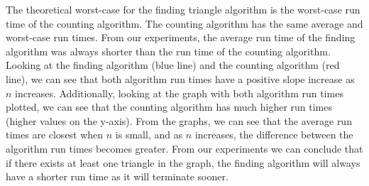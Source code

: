 \documentclass[12pt, letterpaper]{article}
\begin{document}
\begin{enumerate}
    The theoretical worst-case for the finding triangle algorithm is the worst-case run time of the counting algorithm. The counting algorithm has the same average and worst-case run times. From our experiments, the average run time of the finding algorithm was always shorter than the run time of the counting algorithm.  Looking at the finding algorithm (blue line) and the counting algorithm (red line), we can see that both algorithm run times have a positive slope increase as $n$ increases. Additionally, looking at the graph with both algorithm run times plotted, we can see that the counting algorithm has much higher run times (higher values on the y-axis). From the graphs, we can see that the average run times are closest when $n$ is small, and as $n$ increases, the difference between the algorithm run times becomes greater. From our experiments we can conclude that if there exists at least one triangle in the graph, the finding algorithm will always have a shorter run time as it will terminate sooner.  

\end{enumerate}
\end{document}
